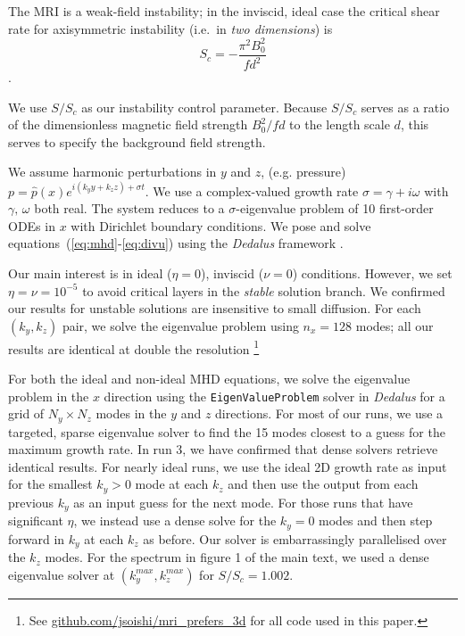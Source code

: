 \documentclass[openacc]{rsproca_new}%
\newcommand{\SSC}{S/S_{c}}
\begin{document}
The MRI is a weak-field instability; in the inviscid, ideal case the critical shear rate for axisymmetric instability (i.e.\ in \emph{two dimensions}) is
\begin{equation}\label{eq:Sc}
  S_{c}=-\frac{\pi^{2}B_{0}^2}{fd^2}
\end{equation}
\cite{2015RSPSA.47140699V}.

We use $\SSC$ as our instability control parameter.
Because $\SSC$ serves as a ratio of the dimensionless magnetic field strength $B_0^2/f d$ to the length scale $d$, this serves to specify the background field strength.

We assume harmonic perturbations in $y$ and $z$, (e.g. pressure) $p=\hat{p}(x)e^{i(k_{y}y+k_{z}z)+\sigma{t}}$. 
We use a complex-valued growth rate $\sigma=\gamma+i\omega$ with $\gamma,\,\omega$ both real. 
The system reduces to a $\sigma$-eigenvalue problem of 10 first-order ODEs in $x$ with Dirichlet boundary conditions.
We pose and solve equations~(\ref{eq:mhd}-\ref{eq:divu}) using the \emph{Dedalus} framework \cite{2019arXiv190510388B}.

Our main interest is in ideal ($\eta=0$), inviscid ($\nu=0$) conditions.
However, we set $\eta=\nu=10^{-5}$ to avoid critical layers in the \textit{stable} solution branch.
We confirmed our results for unstable solutions are insensitive to small diffusion. 
For each $(k_{y},k_{z})$ pair, we solve the eigenvalue problem using $n_{x}=128$ modes; all our results are identical at double the resolution \footnote{See \protect\url{github.com/jsoishi/mri_prefers_3d} for all code used in this paper.}

For both the ideal and non-ideal MHD equations, we solve the eigenvalue problem in the $x$ direction using the \texttt{EigenValueProblem} solver in \emph{Dedalus} for a grid of $N_y \times N_z$ modes in the $y$ and $z$ directions.
For most of our runs, we use a targeted, sparse eigenvalue solver to find the 15 modes closest to a guess for the maximum growth rate.
In run 3, we have confirmed that dense solvers retrieve identical results.
For nearly ideal runs, we use the ideal 2D growth rate as input for the smallest $k_{y} > 0$ mode at each $k_{z}$ and then use the output from each previous $k_{y}$ as an input guess for the next mode.
For those runs that have significant $\eta$, we instead use a dense solve for the $k_{y} = 0$ modes and then step forward in $k_{y}$ at each $k_{z}$ as before.
Our solver is embarrassingly parallelised over the $k_{z}$ modes.
For the spectrum in figure 1 of the main text, we used a dense eigenvalue solver at $(k_{y}^{max},k_{z}^{max})$ for $\SSC= 1.002$.
\end{document}
